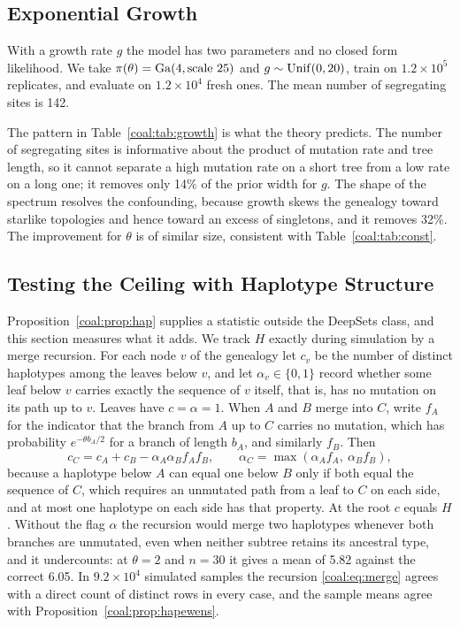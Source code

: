 \subsection{Exponential Growth}\label{coal:sec:growth}

With a growth rate $g$ the model has two parameters and no closed form likelihood. We take $\pi(\theta)=\mathrm{Ga}(4,\text{scale }25)$ and $g\sim\mathrm{Unif}(0,20)$, train on $1.2\times10^5$ replicates, and evaluate on $1.2\times10^4$ fresh ones. The mean number of segregating sites is 142.

The pattern in Table~\ref{coal:tab:growth} is what the theory predicts. The number of segregating sites is informative about the product of mutation rate and tree length, so it cannot separate a high mutation rate on a short tree from a low rate on a long one; it removes only 14\% of the prior width for $g$. The shape of the spectrum resolves the confounding, because growth skews the genealogy toward starlike topologies and hence toward an excess of singletons, and it removes 32\%. The improvement for $\theta$ is of similar size, consistent with Table~\ref{coal:tab:const}.

\subsection{Testing the Ceiling with Haplotype Structure}\label{coal:sec:hap}

Proposition~\ref{coal:prop:hap} supplies a statistic outside the DeepSets class, and this section measures what it adds. We track $H$ exactly during simulation by a merge recursion. For each node $v$ of the genealogy let $c_v$ be the number of distinct haplotypes among the leaves below $v$, and let $\alpha_v\in\{0,1\}$ record whether some leaf below $v$ carries exactly the sequence of $v$ itself, that is, has no mutation on its path up to $v$. Leaves have $c=\alpha=1$. When $A$ and $B$ merge into $C$, write $f_A$ for the indicator that the branch from $A$ up to $C$ carries no mutation, which has probability $e^{-\theta b_A/2}$ for a branch of length $b_A$, and similarly $f_B$. Then
\begin{equation}\label{coal:eq:merge}
c_C = c_A + c_B - \alpha_A\alpha_Bf_Af_B,\qquad \alpha_C=\max(\alpha_Af_A,\ \alpha_Bf_B),
\end{equation}
because a haplotype below $A$ can equal one below $B$ only if both equal the sequence of $C$, which requires an unmutated path from a leaf to $C$ on each side, and at most one haplotype on each side has that property. At the root $c$ equals $H$. Without the flag $\alpha$ the recursion would merge two haplotypes whenever both branches are unmutated, even when neither subtree retains its ancestral type, and it undercounts: at $\theta=2$ and $n=30$ it gives a mean of 5.82 against the correct 6.05. In $9.2\times10^4$ simulated samples the recursion \eqref{coal:eq:merge} agrees with a direct count of distinct rows in every case, and the sample means agree with Proposition~\ref{coal:prop:hapewens}.

